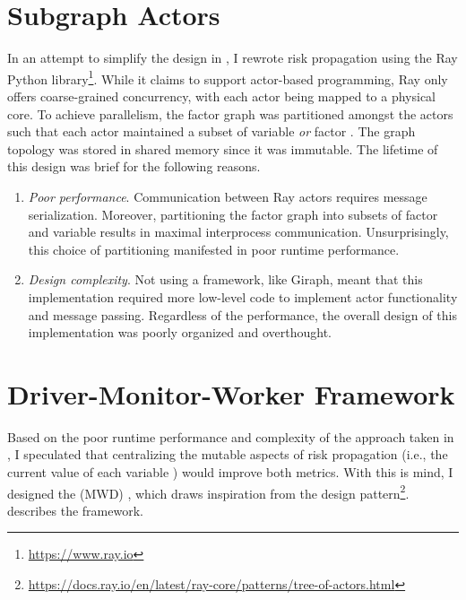 \section{Subgraph Actors}\label{sec:subgraph-actors}

In an attempt to simplify the design in , I rewrote risk propagation using the Ray Python library\footnote{\url{https://www.ray.io}}. While it claims to support actor-based programming, Ray only offers coarse-grained concurrency, with each actor being mapped to a physical core. To achieve parallelism, the factor graph was partitioned amongst the actors such that each actor maintained a subset of variable \verticesName{} \emph{or} factor \verticesName. The graph topology was stored in shared memory since it was immutable. The lifetime of this design was brief for the following reasons.
  \begin{enumerate}
    \item \emph{Poor performance}. Communication between Ray actors requires message serialization. Moreover, partitioning the factor graph into subsets of factor \verticesName{} and variable \verticesName{} results in maximal interprocess communication. Unsurprisingly, this choice of partitioning manifested in poor runtime performance.
    \item \emph{Design complexity}. Not using a framework, like Giraph, meant that this implementation required more low-level code to implement actor functionality and message passing. Regardless of the performance, the overall design of this implementation was poorly organized and overthought.
  \end{enumerate}

\section{Driver-Monitor-Worker Framework}\label{sec:mwd-framework}

Based on the poor runtime performance and complexity of the approach taken in , I speculated that centralizing the mutable aspects of risk propagation (i.e., the current value of each variable \vertexName) would improve both metrics. With this is mind, I designed the  (MWD) , which draws inspiration from the  design pattern\footnote{\url{https://docs.ray.io/en/latest/ray-core/patterns/tree-of-actors.html}}.  describes the framework.

